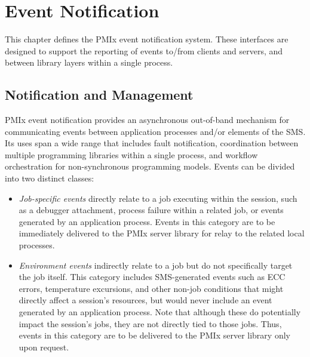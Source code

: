 \chapter{Event Notification}
\label{chap:api_event}

This chapter defines the \ac{PMIx} event notification system.
These interfaces are designed to support the reporting of events to/from clients and servers, and between library layers within a single process.

\section{Notification and Management}
\label{chap:api_event:notify}

\ac{PMIx} event notification provides an asynchronous out-of-band mechanism for communicating events between application processes and/or elements of the \ac{SMS}. Its uses span a wide range that includes fault notification, coordination between multiple programming libraries within a single process, and workflow orchestration for non-synchronous programming models. Events can be divided into two distinct classes:

\begin{itemize}
\item \textit{Job-specific events} directly relate to a job executing within the session, such as a debugger attachment, process failure within a related job, or events generated by an application process. Events in this category are to be immediately delivered to the \ac{PMIx} server library for relay to the related local processes.

\item \textit{Environment events} indirectly relate to a job but do not specifically target the job itself. This category includes \ac{SMS}-generated events such as \ac{ECC} errors, temperature excursions, and other non-job conditions that might directly affect a session's resources, but would never include an event generated by an application process. Note that although these do potentially impact the session's jobs, they are not directly tied to those jobs. Thus, events in this category are to be delivered to the \ac{PMIx} server library only upon request.
\end{itemize}

